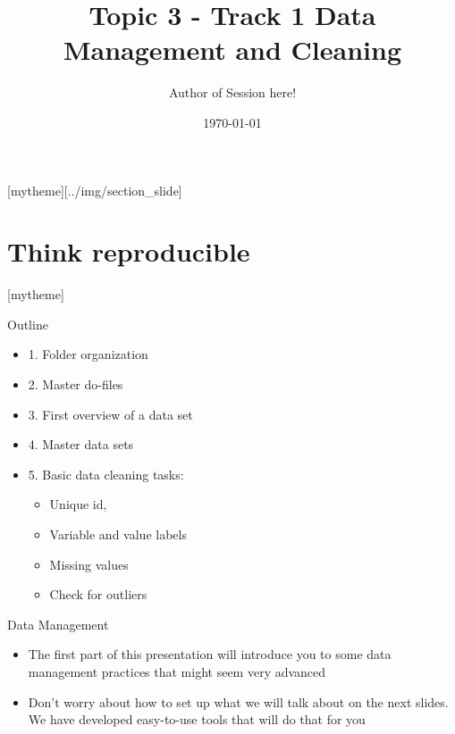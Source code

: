 \documentclass[aspectratio=169]{beamer}
\title{Topic 3 - Track 1 \newline Data Management and Cleaning}
\date{\today}
\author{Author of Session here!} %
\institute{Development Impact Evaluation (DIME) \newline The World Bank }
\newcommand{\sectionpic}[2]{
	\setbeamertemplate{section page}[mytheme][#2]
	\section{#1}
	\setbeamertemplate{section page}[mytheme]
}
\begin{document}
	
{
	\maketitle
}

\sectionpic{Think reproducible}{../img/section_slide}


\begin{frame}{Outline}
	\begin{itemize}
		\item 1. Folder organization
		\item 2. Master do-files
		\item 3. First overview of a data set
		\item 4. Master data sets
		\item 5. Basic data cleaning tasks:
			\begin{itemize}
				\item Unique id, 
				\item Variable and value labels
				\item Missing values
				\item Check for outliers
			\end{itemize}		
	\end{itemize}
\end{frame}


\begin{frame}{Data Management}
	\begin{itemize}
		\item The first part of this presentation will introduce you to some data management practices that might seem very advanced
		\item Don’t worry about how to set up what we will talk about on the next slides. We have developed easy-to-use tools that will do that for you
	\end{itemize}
\end{frame}
\end{document}
